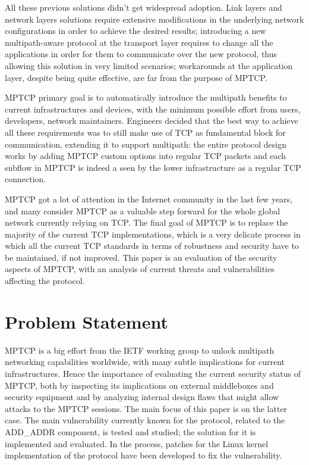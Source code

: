 \vspace{5mm}
All these previous solutions didn't get widespread adoption. Link layers and network layers solutions require extensive modifications in the underlying network configurations in order to achieve the desired results; introducing a new multipath-aware protocol at the transport layer requires to change all the applications in order for them to communicate over the new protocol, thus allowing this solution in very limited scenarios; workarounds at the application layer, despite being quite effective, are far from the purpose of MPTCP.


MPTCP primary goal is to automatically introduce the multipath benefits to current infrastructures and devices, with the minimum possible effort from users, developers, network maintainers. Engineers decided that the best way to achieve all these requirements was to still make use of TCP as fundamental block for communication, extending it to support multipath: the entire protocol design works by adding MPTCP custom options into regular TCP packets and each subflow in MPTCP is indeed a seen by the lower infrastructure as a regular TCP connection. 

\vspace{5mm}
MPTCP got a lot of attention in the Internet community in the last few years, and many consider MPTCP as a valuable step forward for the whole global network currently relying on TCP.
The final goal of MPTCP is to replace the majority of the current TCP implementations, which is a very delicate process in which all the current TCP standards in terms of robustness and security have to be maintained, if not improved. This paper is an evaluation of the security aspects of MPTCP, with an analysis of current threats and vulnerabilities affecting the protocol.

\section{Problem Statement}
MPTCP is a big effort from the IETF working group to unlock multipath networking capabilities worldwide, with many subtle implications for current infrastructures. Hence the importance of evaluating the current security status of MPTCP, both by inspecting its implications on external middleboxes and security equipment and by analyzing internal design flaws that might allow attacks to the MPTCP sessions. The main focus of this paper is on the latter case. The main vulnerability currently known for the protocol, related to the ADD\_ADDR component, is tested and studied; the solution for it is implemented and evaluated. In the process, patches for the Linux kernel implementation of the protocol have been developed to fix the vulnerability. 


